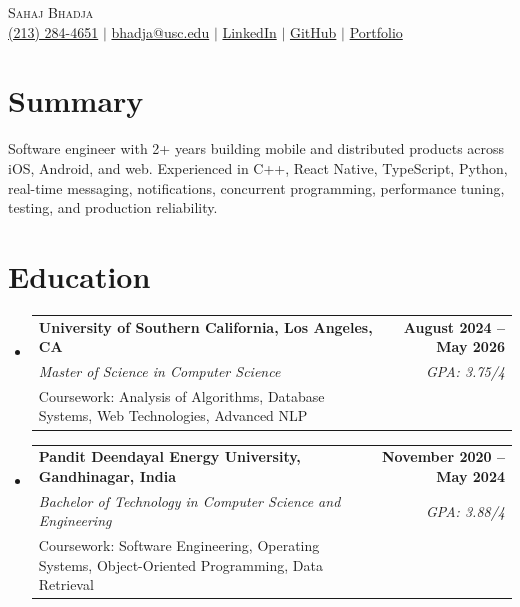 \documentclass[letterpaper,10pt]{article}
\makeatletter
\newcommand{\resumeEduSubheading}[5]{\vspace{-1pt}\item\begin{tabular*}{1.0\textwidth}[t]{l@{\extracolsep{\fill}}r}\textbf{#1} & \textbf{\small #2} \\\textit{\small #3} & \textit{\small #4} \\\small #5 & \\\end{tabular*}\vspace{-4pt}}
\newcommand{\resumeSubHeadingListStart}{\begin{itemize}[leftmargin=0.0in,label={}]}
\newcommand{\resumeSubHeadingListEnd}{\end{itemize}}
\makeatother
\begin{document}
\begin{center}
  {\Huge \scshape Sahaj Bhadja} \\ \vspace{1pt}
  \small \href{tel:2132844651}{(213) 284-4651} $|$ \href{mailto:bhadja@usc.edu}{bhadja@usc.edu} $|$
  \href{https://www.linkedin.com/in/sahaj-bhadja/}{LinkedIn} $|$ \href{https://github.com/sahaj-bhadja}{GitHub} $|$ \href{https://sahaj-bhadja.github.io/}{Portfolio}
\end{center}
\vspace{-13pt}

\section{Summary}
\small Software engineer with 2+ years building mobile and distributed products across iOS, Android, and web. Experienced in C++, React Native, TypeScript, Python, real-time messaging, notifications, concurrent programming, performance tuning, testing, and production reliability.

\section{Education}
\resumeSubHeadingListStart
  \resumeEduSubheading{University of Southern California, Los Angeles, CA}{August 2024 -- May 2026}{Master of Science in Computer Science}{GPA: 3.75/4}{Coursework: Analysis of Algorithms, Database Systems, Web Technologies, Advanced NLP}
  \vspace{2pt}
  \resumeEduSubheading{Pandit Deendayal Energy University, Gandhinagar, India}{November 2020 -- May 2024}{Bachelor of Technology in Computer Science and Engineering}{GPA: 3.88/4}{Coursework: Software Engineering, Operating Systems, Object-Oriented Programming, Data Retrieval}
\resumeSubHeadingListEnd
\end{document}
